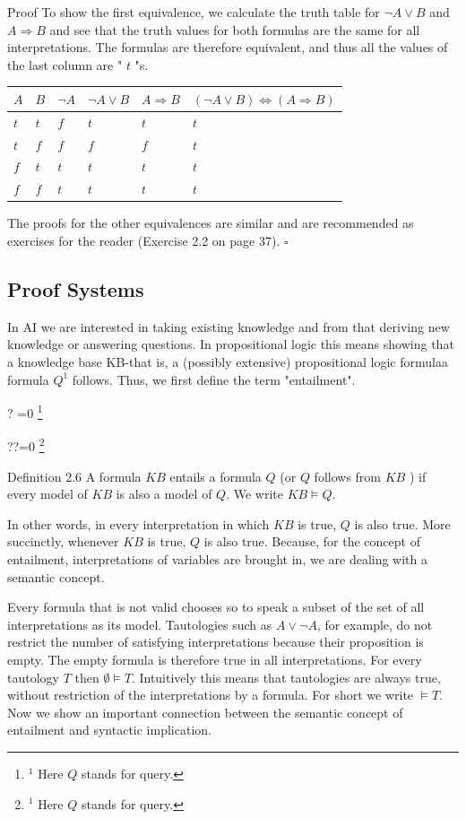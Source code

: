 \documentclass[10pt]{article}
\let\svthefootnote\thefootnote
\newcommand\blfootnotetext[1]{%
  \let\thefootnote\relax\footnote{#1}%
  \addtocounter{footnote}{-1}%
  \let\thefootnote\svthefootnote%
}
\let\svfootnotetext\footnotetext
\renewcommand\footnotetext[2][?]{%
  \if\relax#1\relax%
    \ifnum\value{footnote}=0\blfootnotetext{#2}\else\svfootnotetext{#2}\fi%
  \else%
    \if?#1\ifnum\value{footnote}=0\blfootnotetext{#2}\else\svfootnotetext{#2}\fi%
    \else\svfootnotetext[#1]{#2}\fi%
  \fi
}
\begin{document}
Proof To show the first equivalence, we calculate the truth table for $\neg A \vee B$ and $A \Rightarrow B$ and see that the truth values for both formulas are the same for all interpretations. The formulas are therefore equivalent, and thus all the values of the last column are " $t$ "s.

\begin{center}
\begin{tabular}{llllll}
\hline
$A$ & $B$ & $\neg A$ & $\neg A \vee B$ & $A \Rightarrow B$ & $(\neg A \vee B) \Leftrightarrow(A \Rightarrow B)$ \\
\hline
$t$ & $t$ & $f$ & $t$ & $t$ & $t$ \\
\hline
$t$ & $f$ & $f$ & $f$ & $f$ & $t$ \\
\hline
$f$ & $t$ & $t$ & $t$ & $t$ & $t$ \\
\hline
$f$ & $f$ & $t$ & $t$ & $t$ & $t$ \\
\hline
\end{tabular}
\end{center}

The proofs for the other equivalences are similar and are recommended as exercises for the reader (Exercise 2.2 on page 37). \(\square\)

\subsection*{Proof Systems}
In AI we are interested in taking existing knowledge and from that deriving new knowledge or answering questions. In propositional logic this means showing that a knowledge base KB-that is, a (possibly extensive) propositional logic formulaa formula $Q^{1}$ follows. Thus, we first define the term "entailment".

Definition 2.6 A formula $K B$ entails a formula $Q$ (or $Q$ follows from $K B$ ) if every model of $K B$ is also a model of $Q$. We write $K B \models Q$.

In other words, in every interpretation in which $K B$ is true, $Q$ is also true. More succinctly, whenever $K B$ is true, $Q$ is also true. Because, for the concept of entailment, interpretations of variables are brought in, we are dealing with a semantic concept.

Every formula that is not valid chooses so to speak a subset of the set of all interpretations as its model. Tautologies such as $A \vee \neg A$, for example, do not restrict the number of satisfying interpretations because their proposition is empty. The empty formula is therefore true in all interpretations. For every tautology $T$ then $\emptyset \models T$. Intuitively this means that tautologies are always true, without restriction of the interpretations by a formula. For short we write $\models T$. Now we show an important connection between the semantic concept of entailment and syntactic implication.
\end{document}
